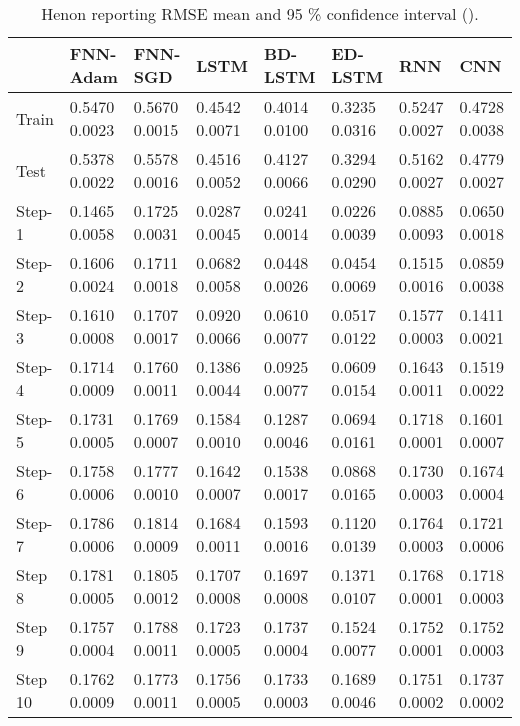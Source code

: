\documentclass[final,5p,times,twocolumn]{elsarticle}
\begin{document}
\begin{table*}[htbp]
 \small 
\begin{tabular}{llllllll}
\hline
 &  FNN-Adam& FNN-SGD & LSTM & BD-LSTM  & ED-LSTM & RNN & CNN\\
\hline
\hline
		
Train &  0.5470   0.0023 & 0.5670    0.0015  & 0.4542    0.0071  &  0.4014   0.0100 &  0.3235   0.0316  &  0.5247   0.0027 & 0.4728 	0.0038\\

Test &  0.5378   0.0022 & 0.5578   0.0016  & 0.4516   0.0052  &  0.4127  0.0066 &  0.3294   0.0290  &  0.5162   0.0027&  	0.4779 	0.0027 \\

Step-1 &  0.1465   0.0058 & 0.1725    0.0031  & 0.0287    0.0045  & 0.0241   0.0014 &  0.0226   0.0039  & 0.0885   0.0093& 	0.0650 	0.0018  \\

Step-2 &  0.1606   0.0024 & 0.1711    0.0018  & 0.0682    0.0058  &  0.0448   0.0026 &  0.0454   0.0069  &  0.1515 0.0016 & 	0.0859	 0.0038 \\

Step-3 &  0.1610   0.0008 & 0.1707    0.0017  & 0.0920   0.0066  &  0.0610   0.0077 &  0.0517   0.0122  &  0.1577   0.0003&  	0.1411 	0.0021 \\

Step-4 &  0.1714   0.0009 & 0.1760    0.0011  & 0.1386   0.0044  &  0.0925   0.0077&  0.0609  0.0154  &  0.1643   0.0011 & 	0.1519 	0.0022\\

Step-5 &  0.1731   0.0005 &0.1769    0.0007  &0.1584    0.0010  &  0.1287   0.0046 &  0.0694   0.0161  &  0.1718   0.0001 & 	0.1601 	0.0007 \\

Step-6 &  0.1758   0.0006 & 0.1777    0.0010  & 0.1642    0.0007  &  0.1538   0.0017 &  0.0868   0.0165  &  0.1730   0.0003 & 	0.1674 	0.0004 \\

Step-7 &  0.1786   0.0006 & 0.1814    0.0009  & 0.1684  0.0011  &  0.1593   0.0016 &  0.1120   0.0139  &  0.1764   0.0003& 	0.1721 	0.0006  \\

Step 8 &  0.1781   0.0005 & 0.1805    0.0012  & 0.1707    0.0008  &  0.1697   0.0008 &  0.1371   0.0107  &  0.1768   0.0001 & 0.1718 	0.0003\\

Step 9 &  0.1757   0.0004 & 0.1788    0.0011  & 0.1723    0.0005  &  0.1737  0.0004 &  0.1524   0.0077  &  0.1752   0.0001 &  	0.1752 	0.0003\\

Step 10 &  0.1762   0.0009 & 0.1773    0.0011  & 0.1756    0.0005  &  0.1733   0.0003 &  0.1689   0.0046  &  0.1751   0.0002 &  0.1737 	0.0002\\

\hline
 
\end{tabular}
\caption{Henon reporting RMSE mean and 95 \% confidence interval   ().}
\label{tab:henon}
\end{table*}
\end{document}
